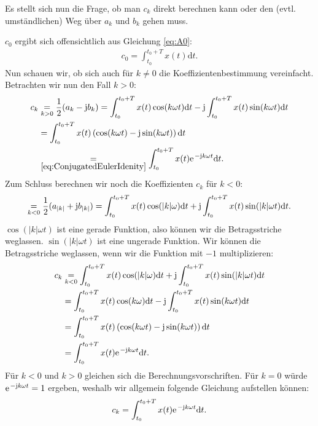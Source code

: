 \documentclass[11pt,a4paper,DIV=12]{scrartcl}
\newcommand{\diff}{\mathrm{d}}
\begin{document}
%
Es stellt sich nun die Frage, ob man $c_k$ direkt berechnen kann oder den (evtl.
umständlichen) Weg über $a_k$ und $b_k$ gehen muss.

$c_0$ ergibt sich offensichtlich aus Gleichung \eqref{eq:A0}:
%
\begin{align}
	c_0=\int_{t_0}^{t_0+T}x(t)\diff t.
\end{align}
%
Nun schauen wir, ob sich auch für $k\neq0$ die Koeffizientenbestimmung
vereinfacht.
%
Betrachten wir nun den Fall $k>0$:
%
\begin{align}
	c_k&\underset{k>0}{=}\frac{1}{2}(a_k-\im b_k)
	=\int_{t_0}^{t_0+T}x(t)\cos(k \omega t)\diff t-\im\int_{t_0}^{t_0+T}x(t)\sin(k \omega t)\diff t\nonumber\\
	&=\int_{t_0}^{t_0+T}x(t)\left (\cos(k\omega t)-\im\sin(k\omega t) \right )\diff t\nonumber\\
	&\underset{\eqref{eq:ConjugatedEulerIdenity}}{=}\int_{t_0}^{t_0+T}x(t)\e^{-\im k \omega t}\diff t.
\end{align}
%
Zum Schluss berechnen wir noch die Koeffizienten $c_k$ für $k<0$:
%
\begin{align}
	\underset{k<0}{=}\frac{1}{2}(a_{|k|}+\im b_{|k|})
	=\int_{t_0}^{t_0+T}x(t)\cos(|k|\omega)\diff t+\im\int_{t_0}^{t_0+T}x(t)\sin(|k| \omega t)\diff t.
\end{align}
%
$\cos(|k| \omega t)$ ist eine gerade Funktion, also können wir die Betragsstriche
weglassen.
%
$\sin(|k| \omega t)$ ist eine ungerade Funktion. Wir können die Betragsstriche
weglassen, wenn wir die Funktion mit $-1$ multiplizieren:
%
\begin{align}
	c_k&\underset{k<0}{=}\int_{t_0}^{t_0+T}x(t)\cos(|k|\omega)\diff t+\im\int_{t_0}^{t_0+T}x(t)\sin(|k| \omega t)\diff t\nonumber\\
	&=\int_{t_0}^{t_0+T}x(t)\cos(k\omega)\diff t-\im\int_{t_0}^{t_0+T}x(t)\sin(k \omega t)\diff t\nonumber\\
	&=\int_{t_0}^{t_0+T}x(t)\left (\cos(k\omega t)-\im\sin(k\omega t)\right )\diff t\nonumber\\
	&=\int_{t_0}^{t_0+T}x(t)\e^{-\im k \omega t}\diff t.
\end{align}
%
Für $k<0$ und $k>0$ gleichen sich die Berechnungsvorschriften. Für $k=0$ würde
$\e^{-\im k \omega t}=1$ ergeben, weshalb wir allgemein folgende Gleichung
aufstellen können:
%
\begin{align}
	c_k=\int_{t_0}^{t_0+T}x(t)\e^{-\im k \omega t}\diff t.
\end{align}
%
\newpage
\end{document}
